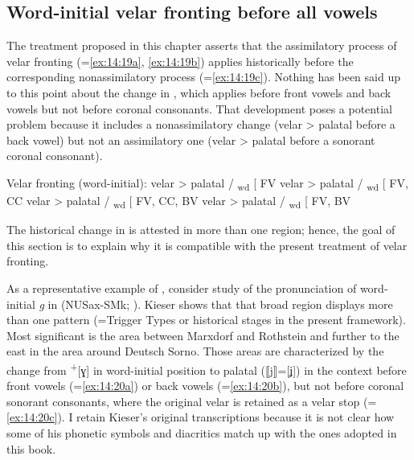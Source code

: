 \subsection{Word-initial velar fronting before all vowels}\label{sec:14.2.4}

The treatment proposed in this chapter asserts that the assimilatory process of velar fronting (=\ref{ex:14:19a}, \ref{ex:14:19b}) applies historically before the corresponding nonassimilatory process (=\ref{ex:14:19c}). Nothing has been said up to this point about the change in , which applies before front vowels and back vowels but not before coronal consonants. That development poses a potential problem because it includes a nonassimilatory change (velar > palatal before a back vowel) but not an assimilatory one (velar > palatal before a sonorant coronal consonant).

\ea%
\label{ex:14:19}Velar fronting (word-initial):
\ea\label{ex:14:19a} velar > palatal / \textsubscript{wd} [ {\longrule}{\longrule} FV
\ex\label{ex:14:19b} velar > palatal / \textsubscript{wd} [ {\longrule}{\longrule} FV, CC
\ex\label{ex:14:19c} velar > palatal / \textsubscript{wd} [ {\longrule}{\longrule} FV, CC, BV
\ex\label{ex:14:19d} velar > palatal / \textsubscript{wd} [ {\longrule}{\longrule} FV, BV
    \z
\z 

The historical change in  is attested in more than one region; hence, the goal of this section is to explain why it is compatible with the present treatment of velar fronting.

As a representative example of , consider  study of the pronunciation of word-initial \textit{g} in  (NUSax-SMk; ). Kieser shows that that broad region displays more than one pattern (=Trigger Types or historical stages in the present framework). Most significant is the area between Marxdorf and Rothstein and further to the east in the area around Deutsch Sorno. Those areas are characterized by the change from  \textsuperscript{+}[ɣ] in word-initial position to palatal (⟦j⟧=[ʝ]) in the context before front vowels (=\ref{ex:14:20a}) or back vowels (=\ref{ex:14:20b}), but not before coronal sonorant consonants, where the original velar is retained as a velar stop (=\ref{ex:14:20c}). I retain Kieser’s original transcriptions because it is not clear how some of his phonetic symbols and diacritics match up with the ones adopted in this book.

